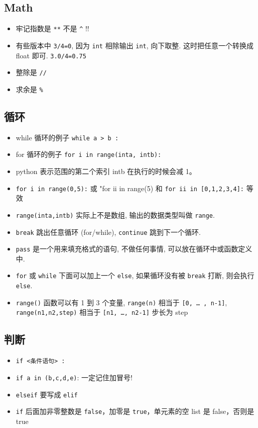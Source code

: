 \subsection{Math}
\begin{itemize}
\item 牢记指数是 \verb`**` 不是 \verb`^` !!
\item 有些版本中 \verb`3/4=0`, 因为 \verb|int| 相除输出 \verb|int|, 向下取整. 这时把任意一个转换成 float 即可. \verb|3.0/4=0.75|
\item 整除是 \verb`//`
\item 求余是 \verb`%`
\end{itemize}

\subsection{循环}
\begin{itemize}
\item while 循环的例子  \verb`while a > b :`
\item for 循环的例子 \verb`for i in range(inta, intb):`
\item python 表示范围的第二个索引 intb 在执行的时候会减 1。
\item \verb`for i in range(0,5):` 或 "for ii in range(5) 和 \verb`for ii in [0,1,2,3,4]:` 等效
\item \verb`range(inta,intb)` 实际上不是数组, 输出的数据类型叫做 \verb|range|.
\item \verb`break` 跳出任意循环 (for/while), \verb`continue` 跳到下一个循环.
\item \verb`pass` 是一个用来填充格式的语句, 不做任何事情, 可以放在循环中或函数定义中.
\item \verb|for| 或 \verb|while| 下面可以加上一个 \verb|else|, 如果循环没有被 \verb|break| 打断, 则会执行 \verb|else|.
\item \verb|range()| 函数可以有 1 到 3 个变量, \verb`range(n)` 相当于 \verb`[0, … , n-1]`, \verb`range(n1,n2,step)` 相当于 \verb`[n1, …, n2-1]` 步长为 step 
\end{itemize}

\subsection{判断}
\begin{itemize}
\item \verb`if <条件语句> :`
\item \verb`if a in (b,c,d,e)`:   一定记住加冒号!
\item \verb`elseif` 要写成 \verb`elif`
\item \verb`if` 后面加非零整数是 \verb`false`，加零是 \verb`true`，单元素的空 list 是 false，否则是 true
\end{itemize}

